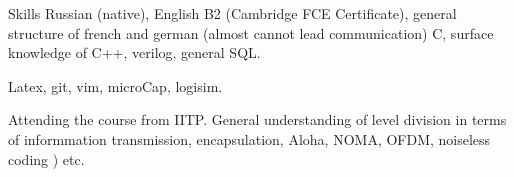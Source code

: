 
\begin{rubric}{Skills}
\entry*[Languages]
	Russian (native), English B2 (Cambridge FCE Certificate), general structure of french and
german (almost cannot lead communication)
	C, surface knowledge of C++, verilog, general SQL.

\entry*[Tools]
	Latex, git, vim, microCap, logisim.

\entry*[Telecom]
	Attending the course from IITP. General understanding of level division in terms of informmation transmission, encapsulation, Aloha, NOMA, OFDM, noiseless coding ) etc.

\end{rubric}
